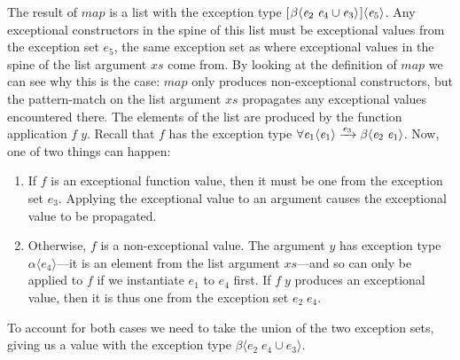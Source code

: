 \documentclass{llncs}
\newcommand{\Varid}[1]{\mathit{#1}}
\newcommand\hsforall{\global\let\hsdot=\hsperiodonce}
\newcommand*\hsperiodonce[2]{#2\global\let\hsdot=\hscompose}
\newcommand*\hscompose[2]{#1}
\begin{document}
The result of \ensuremath{\Varid{map}} is a list with the exception type \ensuremath{[\mskip1.5mu \beta\langle \Varid{e}_{\mathrm{2}}\;\Varid{e}_{\mathrm{4}}\cup \Varid{e}_{\mathrm{3}} \rangle\mskip1.5mu]\langle \Varid{e}_{\mathrm{5}} \rangle}. Any exceptional constructors in the spine of this list must be exceptional values from the exception set \ensuremath{\Varid{e}_{\mathrm{5}}}, the same exception set as where exceptional values in the spine of the list argument \ensuremath{\Varid{xs}} come from. By looking at the definition of \ensuremath{\Varid{map}} we can see why this is the case: \ensuremath{\Varid{map}} only produces non-exceptional constructors, but the pattern-match on the list argument \ensuremath{\Varid{xs}} propagates any exceptional values encountered there. The elements of the list are produced by the function application \ensuremath{\Varid{f}\;\Varid{y}}. Recall that \ensuremath{\Varid{f}} has the exception type \ensuremath{\forall \Varid{e}_{\mathrm{1}}\hsforall \hsdot{\circ }{.}\alpha\langle \Varid{e}_{\mathrm{1}} \rangle\xrightarrow{ \Varid{e}_{\mathrm{3}}}\beta\langle \Varid{e}_{\mathrm{2}}\;\Varid{e}_{\mathrm{1}} \rangle}. Now, one of two things can happen:
    \begin{enumerate}

        \item If \ensuremath{\Varid{f}} is an exceptional function value, then it must be one from the exception set \ensuremath{\Varid{e}_{\mathrm{3}}}. Applying the exceptional value to an argument causes the exceptional value to be propagated.
        
        \item Otherwise, \ensuremath{\Varid{f}} is a non-exceptional value. The argument \ensuremath{\Varid{y}} has exception type \ensuremath{\alpha\langle \Varid{e}_{\mathrm{4}} \rangle}---it is an element from the list argument \ensuremath{\Varid{xs}}---and so can only be applied to \ensuremath{\Varid{f}} if we instantiate \ensuremath{\Varid{e}_{\mathrm{1}}} to \ensuremath{\Varid{e}_{\mathrm{4}}} first. If \ensuremath{\Varid{f}\;\Varid{y}} produces an exceptional value, then it is thus one from the exception set \ensuremath{\Varid{e}_{\mathrm{2}}\;\Varid{e}_{\mathrm{4}}}.
        
    \end{enumerate}
To account for both cases we need to take the union of the two exception sets, giving us a value with the exception type \mbox{\ensuremath{\beta\langle \Varid{e}_{\mathrm{2}}\;\Varid{e}_{\mathrm{4}}\cup \Varid{e}_{\mathrm{3}} \rangle}}.
\end{document}
